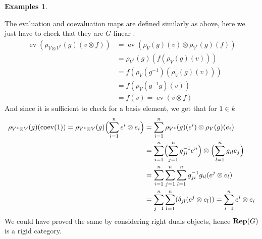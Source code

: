 \documentclass{article}
\theoremstyle{plain}
\theoremstyle{definition}
\newtheorem{examples}[theorem]{Examples}
\DeclareMathOperator{\ev}{ev}
\DeclareMathOperator{\coev}{coev}
\DeclareMathOperator{\Rep}{\bf{Rep}}
\begin{document}
\begin{examples}
\begin{itemize}
    The evaluation and coevaluation maps are defined similarly as above, here we just have to check that they are $G$-linear :
    \begin{equation*}
    \begin{split}
        \ev(\rho_{V\otimes V^*}(g)(v\otimes f)) &= \ev (\rho_V(g)(v)\otimes \rho_{V^*}(g)(f))\\
        & = \rho_{V^*}(g)(f(\rho_V(g)(v))) \\
        & = f(\rho_V(g^{-1})(\rho_V(g)(v))) \\
        & = f(\rho_V(g^{-1}g)(v))\\
        & = f(v) = \ev (v\otimes f)
    \end{split}
    \end{equation*}
    And since it is sufficient to check for a basis element, we get that for $1\in k$
    \begin{equation*}
    \begin{split}
        \rho_{V^*\otimes V}(g)(\coev(1)) = \rho_{V^*\otimes V}(g)\Bigl(\sum^n_{i=1} e^i\otimes e_i\Bigr) & = \sum^n_{i=1}\rho_{V^*}(g)(e^i)\otimes \rho_V(g)(e_i)\\
        & =\sum^n_{i=1} \Bigl( \sum_{j=1}^n g^{-1}_{ji} e^n\Bigr)\otimes \Bigl(\sum^n_{l=1}g_{il}e_j\Bigr) \\
        &= \sum_{i=1}^n\sum_{j=1}^n\sum_{l=1}^n g^{-1}_{ji}g_{il}(e^j\otimes e_l)\\
        & = \sum^n_{j=1}\sum^n_{l=1}(\delta_{jl}(e^j\otimes e_l)) = \sum^n_{i=1} e^i\otimes e_i
    \end{split}
    \end{equation*}
    We could have proved the same by considering right duals objects, hence $\Rep(G)$ is a rigid category.
    
\end{itemize}
\end{examples}
\end{document}
